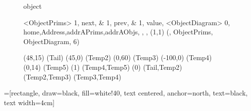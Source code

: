\documentclass{article}
\begin{document}
\begin {figure}
\hspace{.05cm}
\Draw
 {object}

\Indirect \Table <ObjectPrims>
{  
	1, next, \THead &
    1, prev, \TTail &
    1, value, \TSize
}
\Indirect \Table <ObjectDiagram>
 {  0, home,Address,addrAPrims,addrAObjs, , , }
\Scale (1,1)
\OD (\TName, ObjectPrims, ObjectDiagram, 6)

\Move(48,15)
\FcNode(Tail)
\Move(45,0)
\FcNode(Temp2)
\Move(0,60)
\FcNode(Temp3)
\Move(-100,0)
\FcNode(Temp4)
\Move(0,14)
\FcNode(Temp5)
\ArrowHeads(1)
\Edge(Temp4,Temp5)
\ArrowHeads(0)
\Edge(Tail,Temp2)
\Edge(Temp2,Temp3)
\Edge(Temp3,Temp4)
\EndDraw

\caption {\Caption}

\label {fig:ObjectDiagram}

\end {figure}


\newpage
{}=[rectangle, draw=black, fill=white!40,
        text centered, anchor=north, text=black, text width=4cm]
\usetikzlibrary{arrows,positioning,shapes}
\newcommand{\numofnodess}{2}
\end{document}
